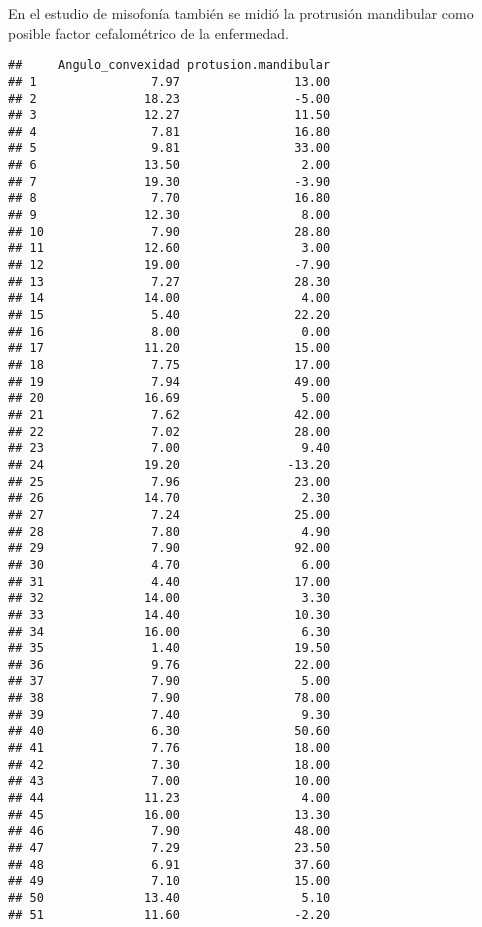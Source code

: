 \documentclass[
]{book}
\begin{document}
En el estudio de misofonía también se midió la protrusión mandibular como posible factor cefalométrico de la enfermedad.

\begin{verbatim}
##     Angulo_convexidad protusion.mandibular
## 1                7.97                13.00
## 2               18.23                -5.00
## 3               12.27                11.50
## 4                7.81                16.80
## 5                9.81                33.00
## 6               13.50                 2.00
## 7               19.30                -3.90
## 8                7.70                16.80
## 9               12.30                 8.00
## 10               7.90                28.80
## 11              12.60                 3.00
## 12              19.00                -7.90
## 13               7.27                28.30
## 14              14.00                 4.00
## 15               5.40                22.20
## 16               8.00                 0.00
## 17              11.20                15.00
## 18               7.75                17.00
## 19               7.94                49.00
## 20              16.69                 5.00
## 21               7.62                42.00
## 22               7.02                28.00
## 23               7.00                 9.40
## 24              19.20               -13.20
## 25               7.96                23.00
## 26              14.70                 2.30
## 27               7.24                25.00
## 28               7.80                 4.90
## 29               7.90                92.00
## 30               4.70                 6.00
## 31               4.40                17.00
## 32              14.00                 3.30
## 33              14.40                10.30
## 34              16.00                 6.30
## 35               1.40                19.50
## 36               9.76                22.00
## 37               7.90                 5.00
## 38               7.90                78.00
## 39               7.40                 9.30
## 40               6.30                50.60
## 41               7.76                18.00
## 42               7.30                18.00
## 43               7.00                10.00
## 44              11.23                 4.00
## 45              16.00                13.30
## 46               7.90                48.00
## 47               7.29                23.50
## 48               6.91                37.60
## 49               7.10                15.00
## 50              13.40                 5.10
## 51              11.60                -2.20

\end{verbatim}
\end{document}

